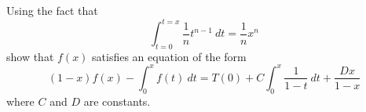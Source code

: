   Using the fact that
  \[
    \int_{t=0}^{t=x} \frac{1}{n} t^{n - 1} \ dt = \frac{1}{n} x^n
  \]
  show that
  $f(x)$ satisfies an equation of the form
  \[
    (1 - x)f(x) - \int_{0}^{x} f(t) \ dt = T(0) + C \int_{0}^{x} \frac{1}{1 - t} \ dt + \frac{Dx}{1 - x}  
  \]
  where $C$ and $D$ are constants.

